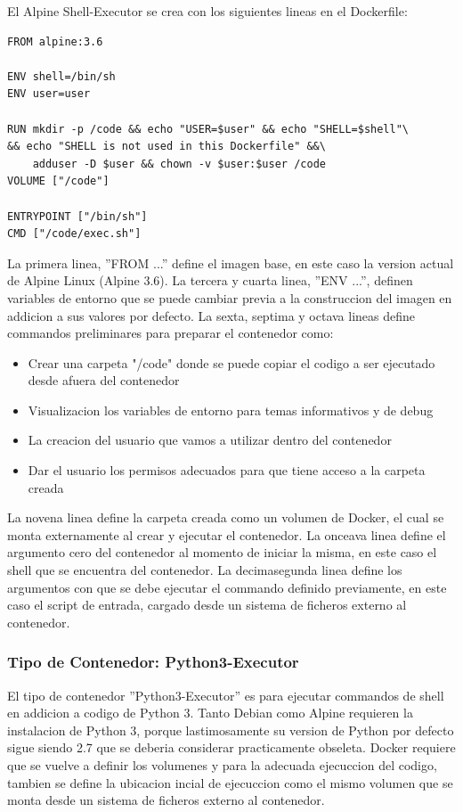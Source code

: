 El Alpine Shell-Executor se crea con los siguientes lineas en el Dockerfile: 
\begin{lstlisting}
FROM alpine:3.6

ENV shell=/bin/sh
ENV user=user

RUN mkdir -p /code && echo "USER=$user" && echo "SHELL=$shell"\
&& echo "SHELL is not used in this Dockerfile" &&\
    adduser -D $user && chown -v $user:$user /code
VOLUME ["/code"]

ENTRYPOINT ["/bin/sh"]
CMD ["/code/exec.sh"]
\end{lstlisting}
La primera linea, ''FROM ...'' define el imagen base, en este caso la version actual de Alpine Linux (Alpine 3.6). La tercera y cuarta linea, ''ENV ...'', definen variables de entorno que se puede cambiar previa a la construccion del imagen en addicion a sus valores por defecto. La sexta, septima y octava lineas define commandos preliminares para preparar el contenedor como:
\begin{itemize}
	\item Crear una carpeta "/code" donde se puede copiar el codigo a ser ejecutado desde afuera del contenedor
	\item Visualizacion los variables de entorno para temas informativos y de debug
	\item La creacion del usuario que vamos a utilizar dentro del contenedor
	\item Dar el usuario los permisos adecuados para que tiene acceso a la carpeta creada
\end{itemize}
La novena linea define la carpeta creada como un volumen de Docker, el cual se monta externamente al crear y ejecutar el contenedor. La onceava linea define el argumento cero del contenedor al momento de iniciar la misma, en este caso el shell que se encuentra del contenedor. La decimasegunda linea define los argumentos con que se debe ejecutar el commando definido previamente, en este caso el script de entrada, cargado desde un sistema de ficheros externo al contenedor.

\subsubsection{Tipo de Contenedor: Python3-Executor}
El tipo de contenedor ''Python3-Executor'' es para ejecutar commandos de shell en addicion a codigo de Python 3. Tanto Debian como Alpine requieren la instalacion de Python 3, porque lastimosamente su version de Python por defecto sigue siendo 2.7 que se deberia considerar practicamente obseleta. Docker requiere que se vuelve a definir los volumenes y para la adecuada ejecuccion del codigo, tambien se define la ubicacion incial de ejecuccion como el mismo volumen que se monta desde un sistema de ficheros externo al contenedor.

